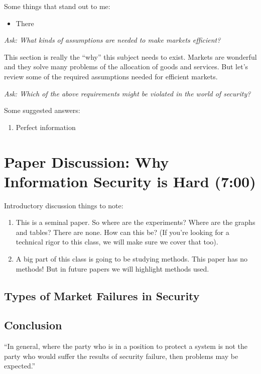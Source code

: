 \documentclass[11pt]{article}
\begin{document}
Some things that stand out to me:

\begin{itemize}
    \item There 
\end{itemize}

{\it Ask: What kinds of assumptions are needed to make markets efficient?}


This section is really the ``why'' this subject needs to exist. 
Markets are wonderful and they solve many problems of the allocation of goods and services.
But let's review some of the required assumptions needed for efficient markets.

{\it Ask: Which of the above requirements might be violated in the world of security?}

Some suggested answers:
\begin{enumerate}
    \item Perfect information
\end{enumerate}

\section{Paper Discussion: Why Information Security is Hard (7:00)}

Introductory discussion things to note:
\begin{enumerate}
    \item This is a seminal paper. So where are the experiments? Where are the graphs and tables? There are none. How can this be? (If you're looking for a technical rigor to this class, we will make sure we cover that too).
    \item A big part of this class is going to be studying methods. This paper has no methods! But in future papers we will highlight methods used. 
\end{enumerate}

\subsection{Types of Market Failures in Security}

\subsection{Conclusion}

“In general, where the party who is in a position to protect a system is not the party who would suffer the results of security failure, then problems may be expected.”
\end{document}

